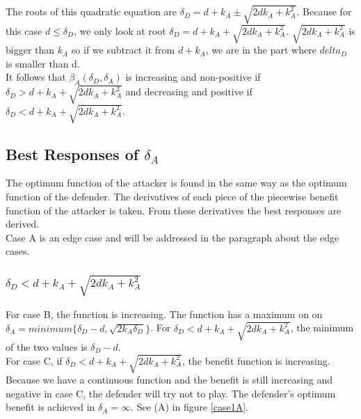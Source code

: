 The roots of this quadratic equation are $\delta_{D}=d+k_{A}\pm \sqrt{2dk_{A}+k_{A}^{2}}$. Because for this case $d\leq \delta_{D}$, we only look at root $\delta_{D}=d+k_{A} + \sqrt{2dk_{A}+k_{A}^{2}}$. $\sqrt{2dk_{A}+k_{A}^{2}}$ is bigger than $k_{A}$ so if we subtract it from $d+k_{A}$, we are in the part where $delta_{D}$ is smaller than d. \\
It follows that $\beta_{A}(\delta_{D},\delta_{A})$ is increasing and non-positive if $\delta_{D}> d+k_{A} + \sqrt{2dk_{A}+k_{A}^{2}}$ and decreasing and positive if $\delta_{D} < d+k_{A} + \sqrt{2dk_{A}+k_{A}^{2}}$. \\

\subsection{Best Responses of $\delta_{A}$}
The optimum function of the attacker is found in the same way as the optimum function of the defender. The derivatives of each piece of the piecewise benefit function of the attacker is taken. From these derivatives the best responses are derived. \\
Case A is an edge case and will be addressed in the paragraph about the edge cases.
%
%

\subsubsection*{$\delta_{D} < d+k_{A} + \sqrt{2dk_{A}+k_{A}^{2}}$} 
For case B, the function is increasing. The function has a maximum on on $\delta_{A} = minimum \{\delta_{D} -d, \sqrt{2k_{A}\delta_{D}} \} $. For $\delta_{D} < d+k_{A} + \sqrt{2dk_{A}+k_{A}^{2}}$, the minimum of the two values is $\delta_{D}-d$.\\
For case C, if $\delta_{D} < d+k_{A} + \sqrt{2dk_{A}+k_{A}^{2}}$, the benefit function is increasing. Because we have a continuous function and the benefit is still increasing and negative in case C, the defender will try not to play. The defender's optimum benefit is achieved in $\delta_{A}=\infty$. See (A) in figure \ref{case1A}.

